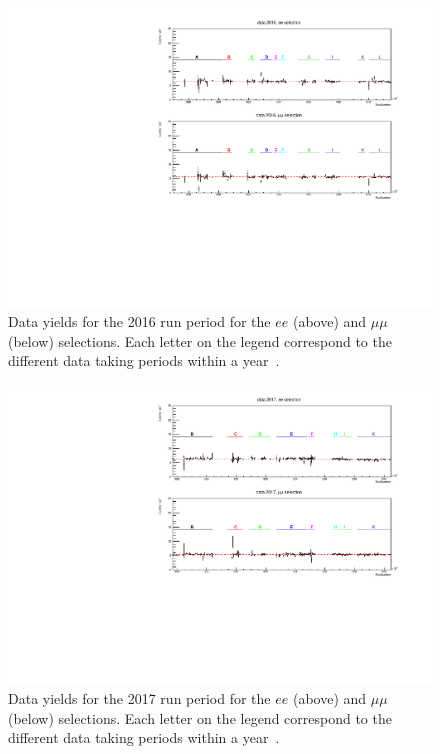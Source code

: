 \begin{figure}[ht]
\centering
\includegraphics[width=\textwidth]{figures/analysis/datamc/Yields/compare_data_yields2016.pdf}
\caption[Data yields for the 2016 run period for the $ee$ (above) and $\mu\mu$ (below) selections.]{Data yields for the 2016 run period for the $ee$ (above) and $\mu\mu$ (below) selections. Each letter on the legend correspond to the different data taking periods within a year~\cite{Aad:2019fac}.}
\label{fig:yields2016}
\end{figure}

\begin{figure}[ht]
\centering
\includegraphics[width=\textwidth]{figures/analysis/datamc/Yields/compare_data_yields2017.pdf}
\caption[Data yields for the 2017 run period for the $ee$ (above) and $\mu\mu$ (below) selections.]{Data yields for the 2017 run period for the $ee$ (above) and $\mu\mu$ (below) selections. Each letter on the legend correspond to the different data taking periods within a year~\cite{Aad:2019fac}.}
\label{fig:yields2017}
\end{figure}

